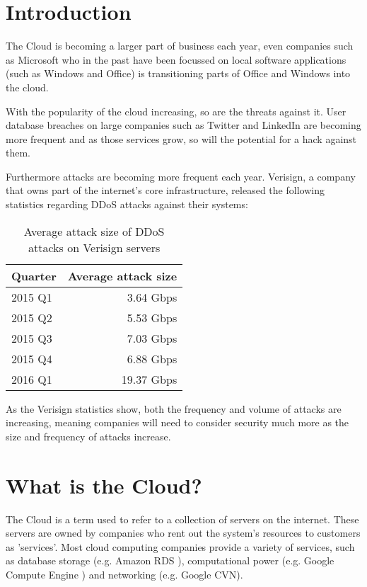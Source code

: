 \section{Introduction}
The Cloud is becoming a larger part of business each year, even companies such as Microsoft who in the past have been focussed on local software applications (such as Windows and Office) is transitioning parts of Office and Windows into the cloud. 

With the popularity of the cloud increasing, so are the threats against it. User database breaches on large companies such as Twitter and LinkedIn \cite{linkedin_update_2012} are becoming more frequent and as those services grow, so will the potential for a hack against them.

Furthermore attacks are becoming more frequent each year. Verisign, a company that owns part of the internet's core infrastructure, released the following statistics regarding DDoS attacks against their systems:

\begin{table}[h!]
    \centering
    \caption{Average attack size of DDoS attacks on Verisign servers\cite{_download_????}}
    \begin{tabular}{| l | r |}
        \hline
        Quarter & Average attack size \\
        \hline
        2015 Q1 & 3.64 Gbps \\
        2015 Q2 & 5.53 Gbps \\
        2015 Q3 & 7.03 Gbps \\
        2015 Q4 & 6.88 Gbps \\
        2016 Q1 & 19.37 Gbps \\
        \hline
    \end{tabular}
    \label{table:1}
\end{table}

As the Verisign statistics show, both the frequency and volume of attacks are increasing, meaning companies will need to consider security much more as the size and frequency of attacks increase.

\section{What is the Cloud?}
The Cloud is a term used to refer to a collection of servers on the internet.
These servers are owned by companies who rent out the system's resources to customers as 'services'. 
Most cloud computing companies provide a variety of services, such as database storage (e.g. Amazon RDS \cite{aws_amazon_2016}), computational power (e.g. Google Compute Engine \cite{google_compute_2016}) and networking (e.g. Google CVN).

